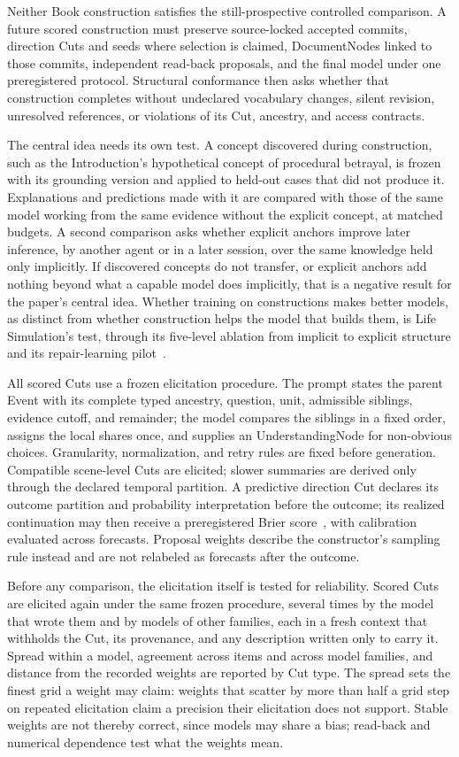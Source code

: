 \documentclass[11pt,a4paper]{article}
\begin{document}
Neither Book construction satisfies the still-prospective controlled comparison.
A future scored construction must preserve source-locked accepted commits,
direction Cuts and seeds where selection is claimed, DocumentNodes linked to
those commits, independent read-back proposals, and the final model under one
preregistered protocol.
Structural conformance then asks whether that construction completes without
undeclared vocabulary changes, silent revision, unresolved references, or
violations of its Cut, ancestry, and access contracts.

The central idea needs its own test. A concept discovered during construction,
such as the Introduction's hypothetical concept of procedural betrayal, is frozen with its grounding version and applied to
held-out cases that did not produce it. Explanations and predictions made with
it are compared with those of the same model working from the same evidence
without the explicit concept, at matched budgets. A second comparison asks
whether explicit anchors improve later inference, by another agent or in a later
session, over the same knowledge held only implicitly. If discovered concepts do
not transfer, or explicit anchors add nothing beyond what a capable model does
implicitly, that is a negative result for the paper's central idea. Whether
training on constructions makes better models, as distinct from whether
construction helps the model that builds them, is Life Simulation's test,
through its five-level ablation from implicit to explicit structure and its
repair-learning pilot~\cite{westerbergLifeSimulation2026}.

All scored Cuts use a frozen elicitation procedure. The prompt states the
parent Event with its complete typed ancestry, question, unit, admissible
siblings, evidence cutoff, and remainder; the model compares the siblings in a
fixed order, assigns the local shares once, and supplies an UnderstandingNode
for non-obvious choices. Granularity,
normalization, and retry rules are fixed before generation. Compatible
scene-level Cuts are elicited; slower summaries are derived only through the
declared temporal partition. A predictive direction Cut declares its outcome
partition and probability interpretation before the outcome; its realized
continuation may then receive a preregistered Brier score~\cite{brier1950}, with calibration
evaluated across forecasts. Proposal weights describe the constructor's
sampling rule instead and are not relabeled as forecasts after the outcome.

Before any comparison, the elicitation itself is tested for reliability. Scored
Cuts are elicited again under the same frozen procedure, several times by the
model that wrote them and by models of other families, each in a fresh context
that withholds the Cut, its provenance, and any description written only to
carry it. Spread within a model, agreement across items and across model
families, and distance from the recorded weights are reported by Cut type. The
spread sets the finest grid a weight may claim: weights that scatter by more
than half a grid step on repeated elicitation claim a precision their
elicitation does not support. Stable weights are not thereby correct, since
models may share a bias; read-back and numerical dependence test what the
weights mean.
\end{document}
